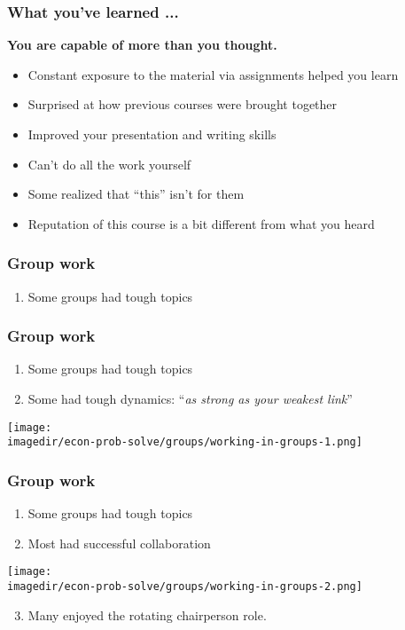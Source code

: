 \begin{frame}\frametitle{What you've learned ...}
	\begin{exampleblock}{}
		\begin{center}
			\textbf{\large You are capable of more than you thought.}
		\end{center}
	\end{exampleblock}
	\begin{itemize}
		\item	Constant exposure to the material via assignments helped you learn
		\item	Surprised at how previous courses were brought together
		\item	Improved your presentation and writing skills
		\item	Can't do all the work yourself
		\item	Some realized that ``this'' isn't for them
		\item	Reputation of this course is a bit different from what you heard
	\end{itemize}
\end{frame}

\begin{frame}\frametitle{Group work}
	\begin{enumerate}
		\item	Some groups had tough topics
	\end{enumerate}
	\vfill
\end{frame}

\begin{frame}\frametitle{Group work}
	\begin{enumerate}
		\item	Some groups had tough topics
		\item	Some had tough dynamics: ``\emph{as strong as your weakest link}''
	\end{enumerate}
	\begin{center}
		\texttt{[image: \\imagedir/econ-prob-solve/groups/working-in-groups-1.png]}
	\end{center}
\end{frame}

\begin{frame}\frametitle{Group work}
	\begin{enumerate}
		\item	Some groups had tough topics
		\item	Most had successful collaboration
	\end{enumerate}
	\begin{center}
		\texttt{[image: \\imagedir/econ-prob-solve/groups/working-in-groups-2.png]}
	\end{center}

	\begin{enumerate}
		\setcounter{enumi}{2}
		\item	Many enjoyed the rotating chairperson role.
	\end{enumerate}
\end{frame}

